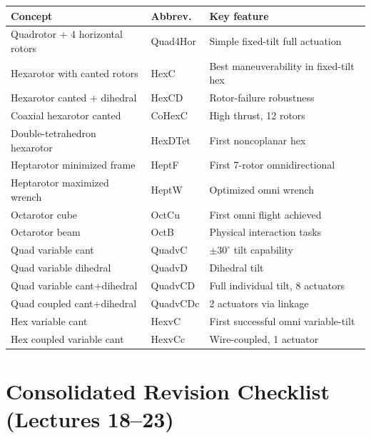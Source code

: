 \documentclass[11pt,a4paper]{article}
\begin{document}
\begin{center}
\begin{tabular}{lll}
\toprule
Concept & Abbrev. & Key feature \\
\midrule
Quadrotor + 4 horizontal rotors & Quad4Hor & Simple fixed-tilt full actuation \\
Hexarotor with canted rotors & HexC & Best maneuverability in fixed-tilt hex \\
Hexarotor canted + dihedral & HexCD & Rotor-failure robustness \\
Coaxial hexarotor canted & CoHexC & High thrust, 12 rotors \\
Double-tetrahedron hexarotor & HexDTet & First noncoplanar hex \\
Heptarotor minimized frame & HeptF & First 7-rotor omnidirectional \\
Heptarotor maximized wrench & HeptW & Optimized omni wrench \\
Octarotor cube & OctCu & First omni flight achieved \\
Octarotor beam & OctB & Physical interaction tasks \\
Quad variable cant & QuadvC & $\pm30^\circ$ tilt capability \\
Quad variable dihedral & QuadvD & Dihedral tilt \\
Quad variable cant+dihedral & QuadvCD & Full individual tilt, 8 actuators \\
Quad coupled cant+dihedral & QuadvCDc & 2 actuators via linkage \\
Hex variable cant & HexvC & First successful omni variable-tilt \\
Hex coupled variable cant & HexvCc & Wire-coupled, 1 actuator \\
\bottomrule
\end{tabular}
\end{center}

\newpage
\section{Consolidated Revision Checklist (Lectures 18--23)}
\end{document}

